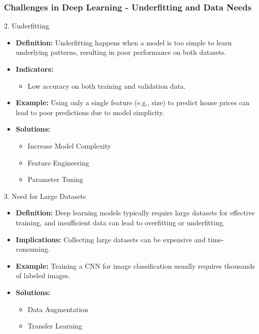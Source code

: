 \documentclass[aspectratio=169]{beamer}
\begin{document}
\begin{frame}[fragile]
    \frametitle{Challenges in Deep Learning - Underfitting and Data Needs}
    \begin{block}{2. Underfitting}
        \begin{itemize}
            \item \textbf{Definition:} Underfitting happens when a model is too simple to learn underlying patterns, resulting in poor performance on both datasets.
            \item \textbf{Indicators:}
                \begin{itemize}
                    \item Low accuracy on both training and validation data.
                \end{itemize}
            \item \textbf{Example:} Using only a single feature (e.g., size) to predict house prices can lead to poor predictions due to model simplicity.
            \item \textbf{Solutions:}
                \begin{itemize}
                    \item Increase Model Complexity
                    \item Feature Engineering
                    \item Parameter Tuning
                \end{itemize}
        \end{itemize}
    \end{block}

    \begin{block}{3. Need for Large Datasets}
        \begin{itemize}
            \item \textbf{Definition:} Deep learning models typically require large datasets for effective training, and insufficient data can lead to overfitting or underfitting.
            \item \textbf{Implications:} Collecting large datasets can be expensive and time-consuming.
            \item \textbf{Example:} Training a CNN for image classification usually requires thousands of labeled images.
            \item \textbf{Solutions:}
                \begin{itemize}
                    \item Data Augmentation
                    \item Transfer Learning
                \end{itemize}
        \end{itemize}
    \end{block}
\end{frame}
\end{document}
